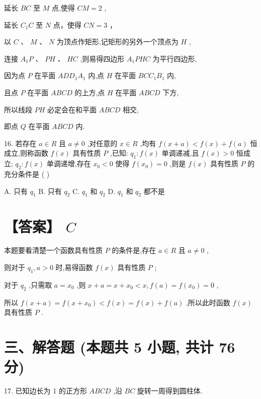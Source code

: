 \documentclass[10pt]{article}
\begin{document}
延长 \({BC}\) 至 \(M\) 点,使得 \({CM} = 2\) ,

延长 \({C}_{1}C\) 至 \(N\) 点，使得 \({CN} = 3\) ，

以 \(C\text{ 、 }M\text{ 、 }N\) 为顶点作矩形,记矩形的另外一个顶点为 \(H\) ,

连接 \({A}_{1}P\text{ 、 }{PH}\text{ 、 }{HC}\) ,则易得四边形 \({A}_{1}{PHC}\) 为平行四边形,

因为点 \(P\) 在平面 \({AD}{D}_{1}{A}_{1}\) 内,点 \(H\) 在平面 \({BC}{C}_{1}{B}_{1}\) 内,

且点 \(P\) 在平面 \({ABCD}\) 的上方,点 \(H\) 在平面 \({ABCD}\) 下方,

所以线段 \({PH}\) 必定会在和平面 \({ABCD}\) 相交,

即点 \(Q\) 在平面 \({ABCD}\) 内.

16. 若存在 \(a \in  R\) 且 \(a \neq  0\) ,对任意的 \(x \in  R\) ,均有 \(f\left( {x + a}\right)  < f\left( x\right)  + f\left( a\right)\) 恒成立,则称函数 \(f\left( x\right)\) 具有性质 \(P\) ,已知: \({q}_{1} : f\left( x\right)\) 单调递减,且 \(f\left( x\right)  > 0\) 恒成立; \({q}_{2} : f\left( x\right)\) 单调递增,存在 \({x}_{0} < 0\) 使得 \(f\left( {x}_{0}\right)  = 0\) ,则是 \(f\left( x\right)\) 具有性质 \(P\) 的充分条件是 ( )

A. 只有 \({q}_{1}\) B. 只有 \({q}_{2}\) C. \({q}_{1}\) 和 \({q}_{2}\) D. \({q}_{1}\) 和 \({q}_{2}\) 都不是

\section*{【答案】 \(C\)}

本题要看清楚一个函数具有性质 \(P\) 的条件是,存在 \(a \in  R\) 且 \(a \neq  0\) ,

则对于 \({q}_{1},a > 0\) 时,易得函数 \(f\left( x\right)\) 具有性质 \(P\) ;

对于 \({q}_{2}\) ,只需取 \(a = {x}_{0}\) ,则 \(x + a = x + {x}_{0} < x,f\left( a\right)  = f\left( {x}_{0}\right)  = 0\) ,

所以 \(f\left( {x + a}\right)  = f\left( {x + {x}_{0}}\right)  < f\left( x\right)  = f\left( x\right)  + f\left( a\right)\) ,所以此时函数 \(f\left( x\right)\) 具有性质 \(P\) .

\section*{三、解答题 (本题共 5 小题, 共计 76 分)}

17. 已知边长为 1 的正方形 \({ABCD}\) ,沿 \({BC}\) 旋转一周得到圆柱体.
\end{document}
